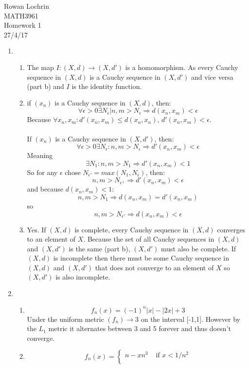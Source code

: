 \documentclass[11pt] {article}
\begin{document}
\begin{flushleft}
Rowan Lochrin\\
MATH3961\\
Homework 1\\
27/4/17\\
\end{flushleft}
\begin{enumerate}
\item
\begin{enumerate}
\item

The map $I: (X,d) \to (X,d')$ is a homomorphism.  As every Cauchy sequence in $(X,d)$ is a Cauchy sequence in $(X,d')$ and vice versa (part b) and $I$ is the identity function. 
\item
if $(x_n)$ is  a Cauchy sequence in $(X,d)$, then:  
$$\forall \epsilon > 0 \exists N_\epsilon|n,m > N_\epsilon \Rightarrow d(x_n, x_m) <  \epsilon $$
Because $\forall x_n,x_m:d'(x_n, x_m) \leq d(x_n,x_n)$, $d'(x_n, x_m) < \epsilon$.
\\ \\
If $(x_n)$ is a Cauchy sequence in $(X,d')$, then:
 $$\forall \epsilon > 0 \exists N_\epsilon : n,m > N_\epsilon \Rightarrow d'(x_n, x_m) <  \epsilon $$
 Meaning
$$\exists N_1: n,m > N_1 \Rightarrow d'(x_n,x_m) < 1 $$
So for any $\epsilon$ chose $N_{\epsilon '} = max(N_1,N_\epsilon)$, then:
$$ n,m > N_\epsilon,  \Rightarrow d'(x_n,x_m) < \epsilon $$ 
and because $d(x_n,x_m) < 1$:
$$  n,m > N_1 \Rightarrow d(x_n,x_m) = d'(x_n,x_m) $$
so
$$  n,m > N_{\epsilon'} \Rightarrow d(x_n,x_m) < \epsilon $$
\item 
Yes. If $(X,d) $ is complete, every Cauchy sequence in $(X,d)$ converges to an element of $X$. Because the set of all Cauchy sequences in $(X,d)$ and $(X,d')$ is the same (part b), $(X,d')$ must also be complete. If $(X,d) $ is incomplete then there must be some Cauchy sequence in $(X,d)$ and $(X,d')$ that does not converge to an element of $X$ so $(X,d')$ is also incomplete.
\end{enumerate}
\item
\begin{enumerate}
\item 
$$f_n(x) = (-1)^n|x|-|2x|+3 $$ Under the uniform metric $(f_n) \to 3$ on the interval [-1,1]. However by the $L_1$ metric it alternates between 3 and 5 forever and thus doesn't converge.\\
\item
 \[
f_n(x)=  \begin{cases} 
       n-xn^3  & \text{  if $x < 1/n^2 $} \\

\end{cases}\]
\end{enumerate}
\end{enumerate}
\end{document}
